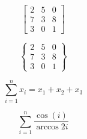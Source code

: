 \documentclass{article}
\begin{document}
\begin{equation}
  \begin{bmatrix}
    2 & 5 & 0 \\
    7 & 3 & 8 \\ 
    3 & 0 & 1
  \end{bmatrix}
\end{equation}

\begin{equation}
  \begin{Bmatrix}
    2 & 5 & 0 \\
    7 & 3 & 8 \\ 
    3 & 0 & 1
  \end{Bmatrix}
\end{equation}

\[
  \sum_{i=1}^{n} x_i = x_{1}+x_{2}+x_{3}
\]

\[
  \sum_{i=1}^{n} \frac{\cos(i)}{\arccos{2i}}
\]
\end{document}
